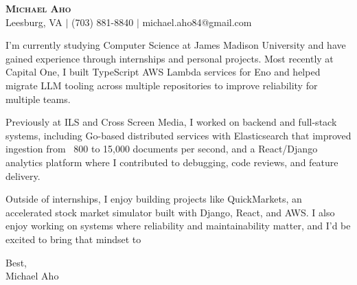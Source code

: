 \documentclass[letterpaper,11pt]{article}
\begin{document}
\begin{center}
    \textbf{\Huge \scshape Michael Aho} \\ \vspace{3pt}
    \normalsize Leesburg, VA $|$ (703) 881-8840 $|$ michael.aho84@gmail.com
\end{center}
\vspace{4pt}




I'm currently studying Computer Science at James Madison University and have gained experience through internships and personal projects. Most recently at Capital One, I built TypeScript AWS Lambda services for Eno and helped migrate LLM tooling across multiple repositories to improve reliability for multiple teams.

Previously at ILS and Cross Screen Media, I worked on backend and full-stack systems, including Go-based distributed services with Elasticsearch that improved ingestion from ~800 to 15,000 documents per second, and a React/Django analytics platform where I contributed to debugging, code reviews, and feature delivery.

Outside of internships, I enjoy building projects like QuickMarkets, an accelerated stock market simulator built with Django, React, and AWS. I also enjoy working on systems where reliability and maintainability matter, and I'd be excited to bring that mindset to %

Best,\\
Michael Aho
\end{document}
